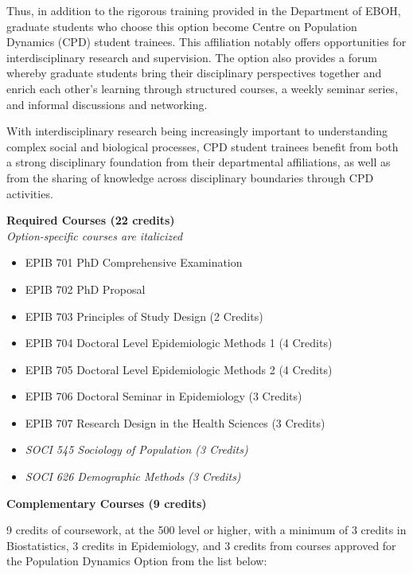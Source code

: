 \documentclass[
  openany]{book}
\providecommand{\tightlist}{%
  \setlength{\itemsep}{0pt}\setlength{\parskip}{0pt}}
\begin{document}
Thus, in addition to the rigorous training provided in the Department of EBOH, graduate students who choose this option become Centre on Population Dynamics (CPD) student trainees. This affiliation notably offers opportunities for interdisciplinary research and supervision. The option also provides a forum whereby graduate students bring their disciplinary perspectives together and enrich each other's learning through structured courses, a weekly seminar series, and informal discussions and networking.

With interdisciplinary research being increasingly important to understanding complex social and biological processes, CPD student trainees benefit from both a strong disciplinary foundation from their departmental affiliations, as well as from the sharing of knowledge across disciplinary boundaries through CPD activities.

\textbf{Required Courses (22 credits)}\\
\emph{Option-specific courses are italicized}

\begin{itemize}
\tightlist
\item
  EPIB 701 PhD Comprehensive Examination
\item
  EPIB 702 PhD Proposal
\item
  EPIB 703 Principles of Study Design (2 Credits)
\item
  EPIB 704 Doctoral Level Epidemiologic Methods 1 (4 Credits)
\item
  EPIB 705 Doctoral Level Epidemiologic Methods 2 (4 Credits)
\item
  EPIB 706 Doctoral Seminar in Epidemiology (3 Credits)
\item
  EPIB 707 Research Design in the Health Sciences (3 Credits)
\item
  \emph{SOCI 545 Sociology of Population (3 Credits)}
\item
  \emph{SOCI 626 Demographic Methods (3 Credits)}
\end{itemize}

\textbf{Complementary Courses (9 credits)}

9 credits of coursework, at the 500 level or higher, with a minimum of 3 credits in Biostatistics, 3 credits in Epidemiology, and 3 credits from courses approved for the Population Dynamics Option from the list below:
\end{document}
